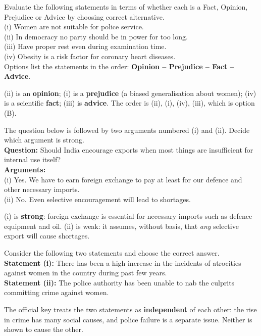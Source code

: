 Evaluate the following statements in terms of whether each is a Fact, Opinion, Prejudice or Advice by choosing correct alternative.\\
(i) Women are not suitable for police service.\\
(ii) In democracy no party should be in power for too long.\\
(iii) Have proper rest even during examination time.\\
(iv) Obesity is a risk factor for coronary heart diseases.\\
Options list the statements in the order: \textbf{Opinion -- Prejudice -- Fact -- Advice}.

(ii) is an \textbf{opinion}; (i) is a \textbf{prejudice} (a biased generalisation about women); (iv) is a scientific \textbf{fact}; (iii) is \textbf{advice}. The order is (ii), (i), (iv), (iii), which is option (B).

The question below is followed by two arguments numbered (i) and (ii). Decide which argument is strong.\\
\textbf{Question:} Should India encourage exports when most things are insufficient for internal use itself?\\
\textbf{Arguments:}\\
(i) Yes. We have to earn foreign exchange to pay at least for our defence and other necessary imports.\\
(ii) No. Even selective encouragement will lead to shortages.

(i) is \textbf{strong}: foreign exchange is essential for necessary imports such as defence equipment and oil. (ii) is weak: it assumes, without basis, that \emph{any} selective export will cause shortages.

Consider the following two statements and choose the correct answer.\\
\textbf{Statement (i):} There has been a high increase in the incidents of atrocities against women in the country during past few years.\\
\textbf{Statement (ii):} The police authority has been unable to nab the culprits committing crime against women.

The official key treats the two statements as \textbf{independent} of each other: the rise in crime has many social causes, and police failure is a separate issue. Neither is shown to cause the other.
